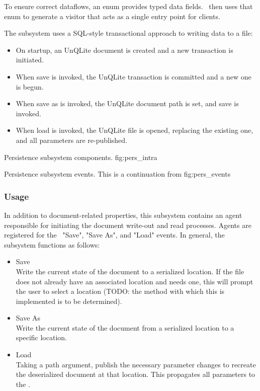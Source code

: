 To ensure correct dataflows, an enum provides typed data fields.
\permod\ then uses that enum to generate a visitor that acts as a single entry point for clients.

The subsystem uses a SQL-style transactional approach to writing data to a file:
\begin{itemize}
      \item On startup, an UnQLite document is created and a new transaction is initiated.
      \item When save is invoked, the UnQLite transaction is committed and a new one is begun.
      \item When save as is invoked, the UnQLite document path is set, and save is invoked.
      \item When load is invoked, the UnQLite file is opened, replacing the existing one, and all parameters are re-published.
\end{itemize}


{Persistence subsystem components.}
{fig:pers_intra}

{Persistence subsystem events.  This is a continuation from }
{fig:pers_events}


\subsubsection{Usage}
In addition to document-related properties, this subsystem contains an agent responsible for initiating the document write-out and read processes.
Agents are registered for the \uimod\ "Save", "Save As", and "Load" events.
In general, the subsystem functions as follows:
\begin{itemize}
      \item Save \\
            Write the current state of the document to a serialized location.
            If the file does not already have an associated location and needs one, this will prompt the user to select a location (TODO: the method with which this is implemented is to be determined).
      \item Save As \\
            Write the current state of the document from a serialized location to a specific location.
      \item Load \\
            Taking a path argument, publish the necessary parameter changes to recreate the deserialized document at that location.
            This propagates all parameters to the \docftype.
\end{itemize}